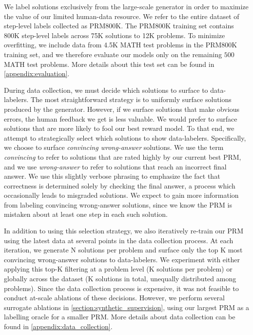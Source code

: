 We label solutions exclusively from the large-scale generator in order to maximize the value of our limited human-data resource. We refer to the entire dataset of step-level labels collected as PRM800K. The PRM800K training set contains 800K step-level labels across 75K solutions to 12K problems. To minimize overfitting, we include data from 4.5K MATH test problems in the PRM800K training set, and we therefore evaluate our models only on the remaining $500$ MATH test problems. More details about this test set can be found in \ref{appendix:evaluation}.

During data collection, we must decide which solutions to surface to data-labelers. The most straightforward strategy is to uniformly surface solutions produced by the generator. However, if we surface solutions that make obvious errors, the human feedback we get is less valuable. We would prefer to surface solutions that are more likely to fool our best reward model. To that end, we attempt to strategically select which solutions to show data-labelers. Specifically, we choose to surface \textit{convincing wrong-answer} solutions. We use the term \textit{convincing} to refer to solutions that are rated highly by our current best PRM, and we use \textit{wrong-answer} to refer to solutions that reach an incorrect final answer. We use this slightly verbose phrasing to emphasize the fact that correctness is determined solely by checking the final answer, a process which occasionally leads to misgraded solutions. We expect to gain more information from labeling convincing wrong-answer solutions, since we know the PRM is mistaken about at least one step in each such solution.

In addition to using this selection strategy, we also iteratively re-train our PRM using the latest data at several points in the data collection process. At each iteration, we generate N solutions per problem and surface only the top K most convincing wrong-answer solutions to data-labelers. We experiment with either applying this top-K filtering at a problem level (K solutions per problem) or globally across the dataset (K solutions in total, unequally distributed among problems). Since the data collection process is expensive, it was not feasible to conduct at-scale ablations of these decisions. However, we perform several surrogate ablations in \ref{section:synthetic_supervision}, using our largest PRM as a labelling oracle for a smaller PRM. More details about data collection can be found in \ref{appendix:data_collection}.

